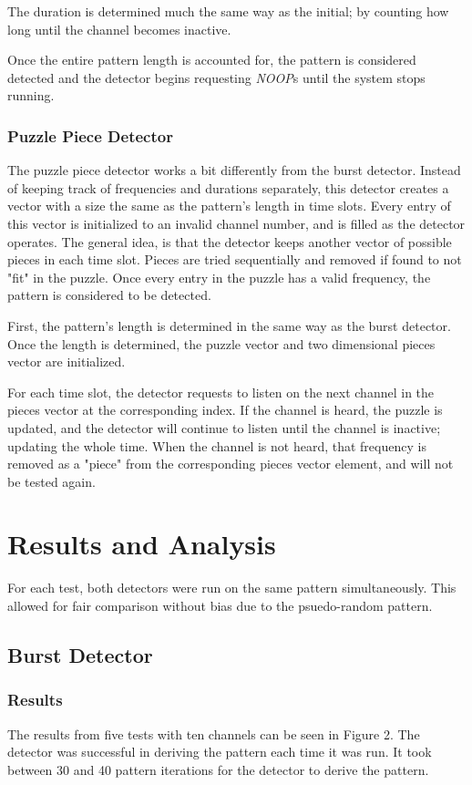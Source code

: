 \documentclass[conference]{IEEEtran}
\begin{document}
The duration is determined much the same way as the initial; by counting how long until the channel becomes inactive.

Once the entire pattern length is accounted for, the pattern is considered detected and the detector begins requesting \textit{NOOP}s until the system stops running.

\subsubsection{Puzzle Piece Detector}

The puzzle piece detector works a bit differently from the burst detector.
Instead of keeping track of frequencies and durations separately, this detector creates a vector with a size the same as the pattern's length in time slots.
Every entry of this vector is initialized to an invalid channel number, and is filled as the detector operates.
The general idea, is that the detector keeps another vector of possible pieces in each time slot.
Pieces are tried sequentially and removed if found to not "fit" in the puzzle.
Once every entry in the puzzle has a valid frequency, the pattern is considered to be detected.

First, the pattern's length is determined in the same way as the burst detector.
Once the length is determined, the puzzle vector and two dimensional pieces vector are initialized.

For each time slot, the detector requests to listen on the next channel in the pieces vector at the corresponding index.
If the channel is heard, the puzzle is updated, and the detector will continue to listen until the channel is inactive; updating the whole time.
When the channel is not heard, that frequency is removed as a "piece" from the corresponding pieces vector element, and will not be tested again.

\section{Results and Analysis}

For each test, both detectors were run on the same pattern simultaneously.
This allowed for fair comparison without bias due to the psuedo-random pattern.

\subsection{Burst Detector}


\subsubsection{Results}
The results from five tests with ten channels can be seen in Figure 2.
The detector was successful in deriving the pattern each time it was run.
It took between 30 and 40 pattern iterations for the detector to derive the pattern.
\end{document}
